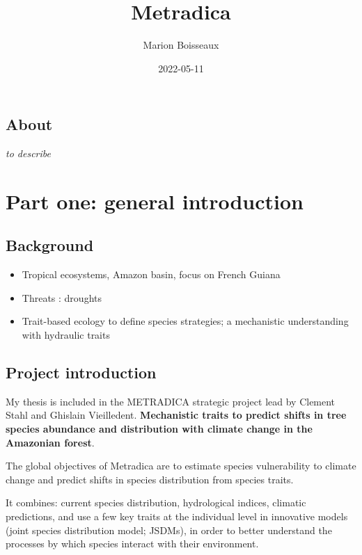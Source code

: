 \documentclass[
]{book}
\title{Metradica}
\author{Marion Boisseaux}
\date{2022-05-11}
\providecommand{\tightlist}{%
  \setlength{\itemsep}{0pt}\setlength{\parskip}{0pt}}
\begin{document}
\maketitle

{
\setcounter{tocdepth}{1}
\tableofcontents
}
\hypertarget{about}{%
\chapter{About}\label{about}}

\emph{to describe}

\hypertarget{part-part-one-general-introduction}{%
\part{Part one: general introduction}\label{part-part-one-general-introduction}}

\hypertarget{background}{%
\chapter{Background}\label{background}}

\begin{itemize}
\tightlist
\item
  Tropical ecosystems, Amazon basin, focus on French Guiana
\item
  Threats : droughts
\item
  Trait-based ecology to define species strategies; a mechanistic understanding with hydraulic traits
\end{itemize}

\hypertarget{project-introduction}{%
\chapter{Project introduction}\label{project-introduction}}

My thesis is included in the METRADICA strategic project lead by Clement Stahl and Ghislain Vieilledent. \textbf{Mechanistic traits to predict shifts in tree species abundance and distribution with climate change in the Amazonian forest}.

The global objectives of Metradica are to estimate species vulnerability to climate change and predict shifts in species distribution from species traits.

It combines: current species distribution, hydrological indices, climatic predictions, and use a few key traits at the individual level in innovative models (joint species distribution model; JSDMs), in order to better understand the processes by which species interact with their environment.
\end{document}
